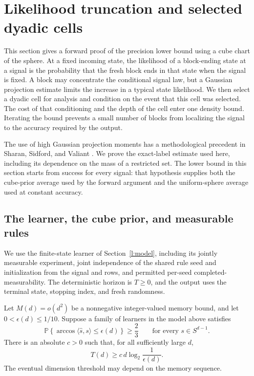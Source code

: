 \section{Likelihood truncation and selected dyadic cells}
\label{sec:l-likelihood-truncation}

This section gives a forward proof of the precision lower bound using a
cube chart of the sphere.  At a fixed incoming state, the likelihood
of a block-ending state at a signal is the probability that the fresh
block ends in that state when the signal is fixed.  A block may
concentrate the conditional signal law, but a Gaussian projection
estimate limits the increase in a typical state likelihood.  We then select a dyadic cell
for analysis and condition on the event that this cell was selected.
The cost of that conditioning and the depth of the cell enter one
density bound.  Iterating the bound prevents a small number of blocks
from localizing the signal to the accuracy required by the output.

The use of high Gaussian projection moments has a methodological
precedent in Sharan, Sidford, and Valiant
\cite[Section~7, Lemma~12]{SSV2019}.  We prove the exact-label estimate
used here, including its dependence on the mass of a restricted set.
The lower bound in this section starts from success for every signal:
that hypothesis supplies both the cube-prior average used by the
forward argument and the uniform-sphere average used at constant
accuracy.

\subsection{The learner, the cube prior, and measurable rules}
\label{subsec:l-lt-model}

We use the finite-state learner of Section~\ref{l:model}, including
its jointly measurable experiment, joint independence of the shared
rule seed and initialization from the signal and rows, and permitted
per-seed completed-measurability.  The deterministic horizon is
\(T\ge0\), and the output uses the terminal state, stopping index,
and fresh randomness.

\begin{theorem}
\label{thm:l-lt-precision}
Let $M(d)=o(d^2)$ be a nonnegative integer-valued memory bound, and let
$0<\epsilon(d)\le1/10$.  Suppose a family of learners in the model
above satisfies
\[
 \mathbb P\!\left\{\arccos\langle\widehat s,s\rangle
              \le\epsilon(d)\right\}\ge\frac23
 \qquad\text{for every }s\in S^{d-1}.
\]
There is an absolute $c>0$ such that, for all sufficiently large $d$,
\[
 T(d)\ge c\,d\log_2\frac1{\epsilon(d)}.
\]
The eventual dimension threshold may depend on the memory sequence.
\end{theorem}

